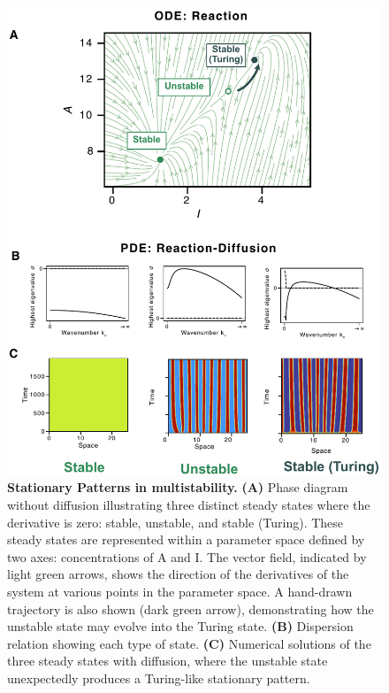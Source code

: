 \begin{figure}[H]
    \includegraphics[width=1\textwidth]{figures/multistability1}

    \caption{\textbf{Stationary Patterns in multistability.} \textbf{(A)} Phase diagram without diffusion illustrating three distinct steady states where the derivative is zero: stable, unstable, and stable (Turing). These steady states are represented within a parameter space defined by two axes: concentrations of A and I. The vector field, indicated by light green arrows, shows the direction of the derivatives of the system at various points in the parameter space. A hand-drawn trajectory is also shown (dark green arrow), demonstrating how the unstable state may evolve into the Turing state. \textbf{(B)} Dispersion relation showing each type of state. \textbf{(C)} Numerical solutions of the three steady states with diffusion, where the unstable state unexpectedly produces a Turing-like stationary pattern. }
    \label{fig:multistability1} %
\end{figure}


